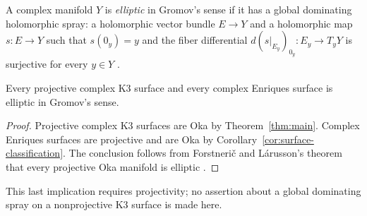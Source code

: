 A complex manifold $Y$ is \emph{elliptic} in Gromov's sense if it has
a global dominating holomorphic spray: a holomorphic vector bundle
$E\to Y$ and a holomorphic map $s:E\to Y$ such that $s(0_y)=y$
and the fiber differential $d(s|_{E_y})_{0_y}:E_y\to T_yY$ is
surjective for every $y\in Y$ \cite{GromovOka}.

\begin{corollary}\label{cor:global-spray}
Every projective complex K3 surface and every complex Enriques surface
is elliptic in Gromov's sense.
\end{corollary}

\begin{proof}
Projective complex K3 surfaces are Oka by Theorem~\ref{thm:main}.
Complex Enriques surfaces are projective
\cite[Section~2]{GallegoGonzalezPurnaprajna} and are Oka by
Corollary~\ref{cor:surface-classification}.
The conclusion follows from Forstneri\v c and L\'arusson's theorem
that every projective Oka manifold is elliptic
\cite[Theorem~1.1]{ForstnericLarussonElliptic}.
\end{proof}

This last implication requires projectivity; no assertion about a
global dominating spray on a nonprojective K3 surface is made here.
